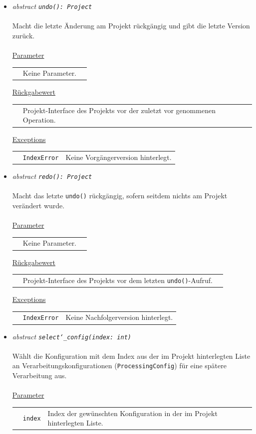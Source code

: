\documentclass{article}
\begin{document}
\begin{itemize}
\item \textit{\flqq{}abstract\frqq} \texttt{\textit{undo(): Project}}\\\\
Macht die letzte Änderung am Projekt rückgängig und gibt die letzte Version zurück.
\\\\
\underline{Parameter}\\
\begin{tabular}{lll}
 & Keine Parameter.
\end{tabular}

\underline{Rückgabewert}\\
\begin{tabular}{lll}
 & Projekt-Interface des Projekts vor der zuletzt vor genommenen Operation.\\
\end{tabular}

\underline{Exceptions}\\
\begin{tabular}{lll}
 & \texttt{IndexError} & Keine Vorgängerversion hinterlegt.\\
\end{tabular}


\item \textit{\flqq{}abstract\frqq} \texttt{\textit{redo(): Project}}\\\\
Macht das letzte \texttt{undo()} rückgängig, sofern seitdem nichts am Projekt verändert wurde.
\\\\
\underline{Parameter}\\
\begin{tabular}{lll}
 & Keine Parameter.
\end{tabular}

\underline{Rückgabewert}\\
\begin{tabular}{lll}
 & Projekt-Interface des Projekts vor dem letzten \texttt{undo()}-Aufruf.\\
\end{tabular}

\underline{Exceptions}\\
\begin{tabular}{lll}
 & \texttt{IndexError} & Keine Nachfolgerversion hinterlegt.\\
\end{tabular}


\item \textit{\flqq{}abstract\frqq} \texttt{\textit{select\char`_config(index: int)}}\\\\
Wählt die Konfiguration mit dem Index  aus der im Projekt hinterlegten Liste an Verarbeitungskonfigurationen (\texttt{ProcessingConfig}) für eine spätere Verarbeitung aus.
\\\\
\underline{Parameter}\\
\begin{tabular}{lll}
 & \texttt{index} & Index der gewünschten Konfiguration in der im Projekt hinterlegten Liste.
\end{tabular}


\end{itemize}
\end{document}
